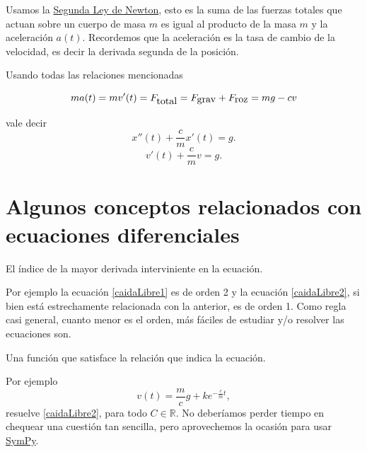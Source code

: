 \documentclass{article}
\newcommand{\rr}{\mathbb{R}}
\begin{document}
 Usamos la \href{http://es.wikipedia.org/wiki/Leyes_de_Newton}{Segunda Ley de Newton}, esto es la suma de las fuerzas totales que actuan sobre un cuerpo de masa $m$
es igual al producto de la masa $m$ y la aceleración $a(t)$. Recordemos que la aceleración es la tasa de cambio de la velocidad, es decir la derivada segunda de la posición.   

  Usando todas las relaciones mencionadas

\[ma(t)=mv'(t)=F_{\hbox{total}}=F_{\hbox{grav}}+F_{\hbox{roz}}=mg-cv\]

vale decir
\begin{equation}\label{caidaLibre1}
 \boxed{ x''(t)+\frac{c}{m} x'(t)=g.}
\end{equation}
\begin{equation}\label{caidaLibre2}
\boxed{ v'(t)+\frac{c}{m} v=g.}
\end{equation}





\section{Algunos conceptos relacionados con ecuaciones diferenciales}

\begin{definicion}[Orden] El índice de la mayor derivada interviniente en la ecuación.
 \end{definicion}

 Por ejemplo la ecuación \eqref{caidaLibre1} es de orden 2 y la
ecuación \eqref{caidaLibre2}, si bien está estrechamente relacionada con la anterior, es de orden 1. Como regla casi general, cuanto menor es el orden,  más fáciles de estudiar y/o resolver las ecuaciones son.

  \begin{definicion}[Solución] Una función que satisface la relación que indica la ecuación.

   \end{definicion}

   Por ejemplo
\begin{equation}\label{SolGencaidaLibre2} v(t)=\frac{m}{c}g+ke^{-\frac{c}{m}t},\end{equation}
resuelve \eqref{caidaLibre2}, para todo $C\in\rr$. No deberíamos perder tiempo en chequear una cuestión tan sencilla, pero aprovechemos la ocasión para usar  \href{http://www.sympy.org}{SymPy}.
\end{document}
